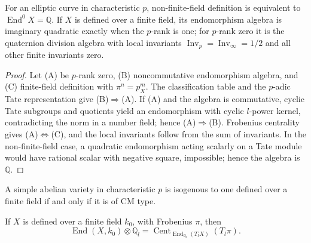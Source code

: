 \begin{theorem}[Deuring]
\label{mumford-thm-deuring-elliptic}
For an elliptic curve in characteristic $p$, non-finite-field definition is
equivalent to $\operatorname{End}^0X=\mathbb Q$. If $X$ is defined over a
finite field, its endomorphism algebra is imaginary quadratic exactly when
the $p$-rank is one; for $p$-rank zero it is the quaternion division algebra
with local invariants $\operatorname{Inv}_p=\operatorname{Inv}_\infty=1/2$
and all other finite invariants zero.
\end{theorem}
\begin{proof}
Let (A) be $p$-rank zero, (B) noncommutative endomorphism algebra, and (C)
finite-field definition with $\pi^n=p_X^m$. The classification table and
the $p$-adic Tate representation give (B)$\Rightarrow$(A). If (A) and the
algebra is commutative, cyclic Tate subgroups and quotients yield an
endomorphism with cyclic $l$-power kernel, contradicting the norm in a
number field; hence (A)$\Rightarrow$(B). Frobenius centrality gives
(A)$\Leftrightarrow$(C), and the local invariants follow from the sum of
invariants. In the non-finite-field case, a quadratic endomorphism acting
scalarly on a Tate module would have rational scalar with negative square,
impossible; hence the algebra is $\mathbb Q$.
\end{proof}

\begin{theorem}
\label{mumford-thm-cm-finite-field-isogeny}
A simple abelian variety in characteristic $p$ is isogenous to one defined
over a finite field if and only if it is of CM type.
\notready
\end{theorem}

\begin{theorem}
\label{mumford-thm-tate-centralizer}
If $X$ is defined over a finite field $k_0$, with Frobenius $\pi$, then
\[
\operatorname{End}(X,k_0)\otimes\mathbb Q_l
=\operatorname{Cent}_{\operatorname{End}_{\mathbb Q_l}(T_lX)}(T_l\pi).
\]
\notready
\end{theorem}

